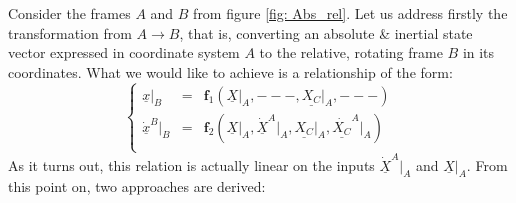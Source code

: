%
\FloatBarrier
%
\indent Consider the frames $A$ and $B$ from figure \ref{fig:	Abs_rel}. Let us address firstly the transformation from $A \rightarrow B$, that is, converting an absolute \& inertial state vector expressed in coordinate system $A$ to the relative, rotating frame $B$ in its coordinates. What we would like to achieve is a relationship of the form:
%
\[
\left\{ \begin{array}{cccc}
\underline{x}\rvert_{B} 			& 	= 	& \bm f_1 \left( \underline{X}\rvert_{A}, ---, \underline{X_C}\rvert_{A}, ---\right) \\ 
\underline{\dot{x}}^{B}\rvert_{B} 	&  	= 	& \bm f_2 \left( \underline{X}\rvert_{A}, \underline{\dot{X}}^{A}\rvert_{A}, \underline{X_C}\rvert_{A}, \underline{\dot{X_C}}^{A}\rvert_{A}\right) \\
\end{array}
\right.
\]
%
\indent As it turns out, this relation is actually linear on the inputs $\underline{\dot{X}}^{A}\rvert_{A}$ and  $\underline{X}\rvert_{A}$. From this point on, two approaches are derived:
%
